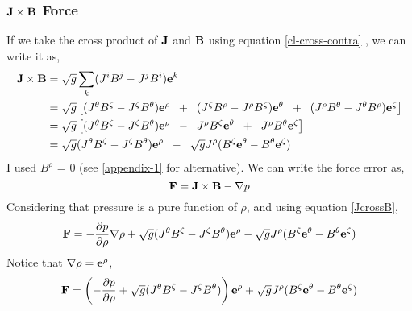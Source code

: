 \subsubsection{$\mathbf{J} \times \mathbf{B} $ Force}
If we take the cross product of  $\mathbf{J}$  and $\mathbf{B}$ using equation \ref{cl-cross-contra} , we can write it as,
\begin{align}
    \mathbf{J} \times \mathbf{B} &= \sqrt{g} \sum_k (J^i B^j - J^j B^i)\mathbf{e}^k \\
    &= \sqrt{g} \begin{bmatrix}
        (J^\theta B^\zeta - J^\zeta B^\theta)\mathbf{e}^\rho  \hspace{.2cm}+\hspace{.2cm}
        (J^\zeta B^\rho - J^\rho B^\zeta)\mathbf{e}^\theta    \hspace{.2cm}+\hspace{.2cm}
        (J^\rho B^\theta - J^\theta B^\rho)\mathbf{e}^\zeta
    \end{bmatrix} \\
    &= \sqrt{g} \begin{bmatrix}
        (J^\theta B^\zeta - J^\zeta B^\theta)\mathbf{e}^\rho  \hspace{.2cm}-\hspace{.2cm}
         J^\rho B^\zeta\mathbf{e}^\theta    \hspace{.2cm}+\hspace{.2cm}
         J^\rho B^\theta\mathbf{e}^\zeta
    \end{bmatrix} \\
    &= \sqrt{g} (J^\theta B^\zeta - J^\zeta B^\theta)\mathbf{e}^\rho  \hspace{.2cm}-\hspace{.2cm}
       \sqrt{g} J^\rho (B^\zeta\mathbf{e}^\theta - B^\theta\mathbf{e}^\zeta) \label{JcrossB}
\end{align}
I used $B^\rho$ = 0 (see \ref{appendix-1} for alternative). We can write the force error as,
\begin{equation}
    \mathbf{F} = \mathbf{J} \times \mathbf{B} - \nabla p
\end{equation}
Considering that pressure is a pure function of $\rho$, and using equation \ref{JcrossB},
\begin{align}
    \mathbf{F} = -\frac{\partial p}{\partial \rho} \nabla \rho + \sqrt{g} (J^\theta B^\zeta - J^\zeta B^\theta)\mathbf{e}^\rho  -  \sqrt{g} J^\rho (B^\zeta\mathbf{e}^\theta - B^\theta\mathbf{e}^\zeta)
\end{align}
Notice that $\nabla \rho = \mathbf{e}^\rho$,
\begin{align}
    \mathbf{F} = \left(-\frac{\partial p}{\partial \rho} + \sqrt{g} (J^\theta B^\zeta - J^\zeta B^\theta) \right)\mathbf{e}^\rho  +  \sqrt{g} J^\rho (B^\zeta\mathbf{e}^\theta - B^\theta\mathbf{e}^\zeta)
\end{align}
